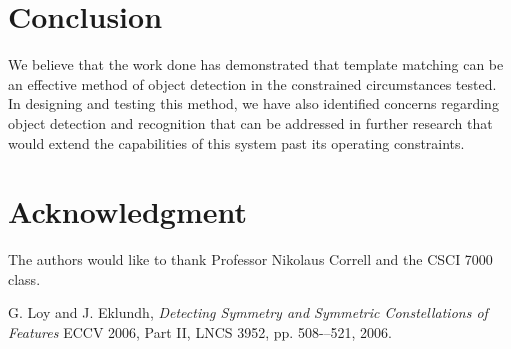 \documentclass[conference]{IEEEtran}
\begin{document}
\section{Conclusion}
We believe that the work done has demonstrated that template matching can be an effective method of object detection in the constrained circumstances tested.  In designing and testing this method, we have also identified concerns regarding object detection and recognition that can be addressed in further research that would extend the capabilities of this system past its operating constraints.



\section*{Acknowledgment}

The authors would like to thank Professor Nikolaus Correll and the CSCI 7000 class.





%
%
%
\begin{thebibliography}{1}


G. Loy and J. Eklundh, \emph{Detecting Symmetry and Symmetric Constellations of Features}
\relax ECCV 2006, Part II, LNCS 3952, pp. 508-–521, 2006.


\end{thebibliography}




\end{document}
